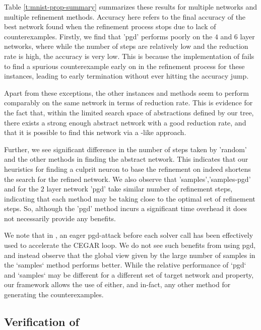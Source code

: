 Table \ref{t:mnist-prop-summary} summarizes these results for multiple \mnist
networks and multiple refinement methods. Accuracy here refers to the final
accuracy of the best network found when the refinement process stops due to lack
of counterexamples. Firstly, we find that 'pgd' performs poorly on the $4$ and
$6$ layer networks, where while the number of steps are relatively low and the
reduction rate is high, the accuracy is very low. This is because the \abcrown
implementation of \pgd fails to find a spurious counterexample early on in the
refinement process for these instances, leading to early termination without
ever hitting the accuracy jump. 

Apart from these exceptions, the other instances and methods seem to perform
comparably on the same network in terms of reduction rate. This is evidence for
the fact that, within the limited search space of abstractions defined by our
tree, there exists a strong enough abstract network with a good reduction rate,
and that it is possible to find this network via a \cegar-like approach. 

Further, we see significant difference in the number of steps taken by 'random'
and the other methods in finding the abstract network. This indicates that our
heuristics for finding a culprit neuron to base the refinement on indeed
shortens the search for the refined network. We also observe that
'samples','samples-pgd' and for the $2$ layer network 'pgd' take similar number
of refinement steps, indicating that each method may be taking close to the
optimal set of refinement steps. So, although the 'pgd' method
incurs a significant time overhead  it does not necessarily
provide any benefits. 

We note that in \cite{cleverest-nn}, an eager pgd-attack before each solver call
has been effectively used to accelerate the CEGAR loop. We do not see such
benefits from using pgd, and instead observe that the global view given by
the large number of samples in the `samples` method performs better. While the
relative performance of `pgd` and `samples` may be different for a different set
of target network and property, our framework allows the use of either, and
in-fact, any other method for generating the counterexamples.

\subsection{Verification of \acasxu}

